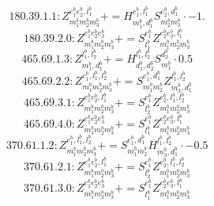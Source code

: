 \documentclass[letterpaper,10pt,fleqn,leqno,onecolumn]{article}
\begin{document}
\begin{equation} \;\;\;\;\;\;  180.39.1.1: Z^{e_{1}^{b}e_{2}^{b},l_{1}^{b}}_{m_{1}^{b}m_{2}^{b}m_{3}^{b}}+=H^{e_{1}^{b},l_{1}^{b}}_{m_{1}^{b},d_{1}^{b}}S^{e_{2}^{b},d_{1}^{b}}_{m_{2}^{b}m_{3}^{b}}\cdot -1. \end{equation}
\begin{equation} \;\;\;\;\;\;  180.39.2.0: Z^{e_{1}^{b}e_{2}^{b}e_{3}^{b}}_{m_{1}^{b}m_{2}^{b}m_{3}^{b}}+=S^{e_{1}^{b}}_{l_{1}^{b}}Z^{e_{2}^{b}e_{3}^{b},l_{1}^{b}}_{m_{1}^{b}m_{2}^{b}m_{3}^{b}} \end{equation}
\begin{equation} \;\;\;\;\;\;  465.69.1.3: Z^{l_{1}^{b},l_{2}^{b}}_{m_{1}^{b},d_{1}^{b}}+=H^{l_{1}^{b},l_{2}^{b}}_{d_{1}^{b},d_{2}^{b}}S^{d_{2}^{b}}_{m_{1}^{b}}\cdot 0.5 \end{equation}
\begin{equation} \;\;\;\;\;\;  465.69.2.2: Z^{e_{1}^{b},l_{1}^{b},l_{2}^{b}}_{m_{1}^{b}m_{2}^{b}m_{3}^{b}}+=S^{e_{1}^{b},d_{1}^{b}}_{m_{1}^{b}m_{2}^{b}}Z^{l_{1}^{b},l_{2}^{b}}_{m_{3}^{b},d_{1}^{b}} \end{equation}
\begin{equation} \;\;\;\;\;\;  465.69.3.1: Z^{e_{1}^{b}e_{2}^{b},l_{1}^{b}}_{m_{1}^{b}m_{2}^{b}m_{3}^{b}}+=S^{e_{1}^{b}}_{l_{2}^{b}}Z^{e_{2}^{b},l_{1}^{b},l_{2}^{b}}_{m_{1}^{b}m_{2}^{b}m_{3}^{b}} \end{equation}
\begin{equation} \;\;\;\;\;\;  465.69.4.0: Z^{e_{1}^{b}e_{2}^{b}e_{3}^{b}}_{m_{1}^{b}m_{2}^{b}m_{3}^{b}}+=S^{e_{1}^{b}}_{l_{1}^{b}}Z^{e_{2}^{b}e_{3}^{b},l_{1}^{b}}_{m_{1}^{b}m_{2}^{b}m_{3}^{b}} \end{equation}
\begin{equation} \;\;\;\;\;\;  370.61.1.2: Z^{e_{1}^{b},l_{1}^{b},l_{2}^{b}}_{m_{1}^{b}m_{2}^{b}m_{3}^{b}}+=S^{e_{1}^{b},d_{1}^{b}}_{m_{1}^{b}m_{2}^{b}}H^{l_{1}^{b},l_{2}^{b}}_{m_{3}^{b},d_{1}^{b}}\cdot -0.5 \end{equation}
\begin{equation} \;\;\;\;\;\;  370.61.2.1: Z^{e_{1}^{b}e_{2}^{b},l_{1}^{b}}_{m_{1}^{b}m_{2}^{b}m_{3}^{b}}+=S^{e_{1}^{b}}_{l_{2}^{b}}Z^{e_{2}^{b},l_{1}^{b},l_{2}^{b}}_{m_{1}^{b}m_{2}^{b}m_{3}^{b}} \end{equation}
\begin{equation} \;\;\;\;\;\;  370.61.3.0: Z^{e_{1}^{b}e_{2}^{b}e_{3}^{b}}_{m_{1}^{b}m_{2}^{b}m_{3}^{b}}+=S^{e_{1}^{b}}_{l_{1}^{b}}Z^{e_{2}^{b}e_{3}^{b},l_{1}^{b}}_{m_{1}^{b}m_{2}^{b}m_{3}^{b}} \end{equation}
\end{document}
